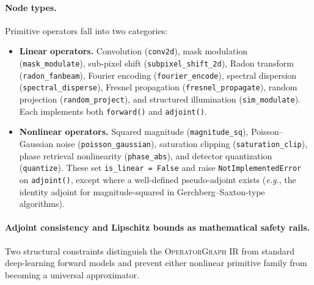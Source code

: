 \documentclass[11pt]{article}
\newcommand{\opg}{\textsc{OperatorGraph}}
\newcommand{\eg}{\textit{e.g.}}
\begin{document}
\paragraph{Node types.}
Primitive operators fall into two categories:

\begin{itemize}
  \item \textbf{Linear operators.}  Convolution (\texttt{conv2d}), mask
    modulation (\texttt{mask\_modulate}), sub-pixel shift (\texttt{subpixel\_shift\_2d}),
    Radon transform (\texttt{radon\_fanbeam}),
    Fourier encoding (\texttt{fourier\_encode}), spectral dispersion
    (\texttt{spectral\_disperse}), Fresnel propagation
    (\texttt{fresnel\_propagate}), random projection
    (\texttt{random\_project}), and structured illumination
    (\texttt{sim\_modulate}).
    Each implements both \texttt{forward()} and \texttt{adjoint()}.
  \item \textbf{Nonlinear operators.}  Squared magnitude
    (\texttt{magnitude\_sq}), Poisson--Gaussian noise
    (\texttt{poisson\_gaussian}), saturation clipping
    (\texttt{saturation\_clip}), phase retrieval nonlinearity
    (\texttt{phase\_abs}), and detector quantization
    (\texttt{quantize}).
    These set \texttt{is\_linear = False} and raise
    \texttt{NotImplementedError} on \texttt{adjoint()}, except where a
    well-defined pseudo-adjoint exists (\eg{}, the identity adjoint for
    magnitude-squared in Gerchberg--Saxton-type algorithms).
\end{itemize}

\paragraph{Adjoint consistency and Lipschitz bounds as mathematical safety rails.}
Two structural constraints distinguish the \opg{} IR from standard deep-learning
forward models and prevent either nonlinear primitive family from becoming a
universal approximator.
\end{document}
